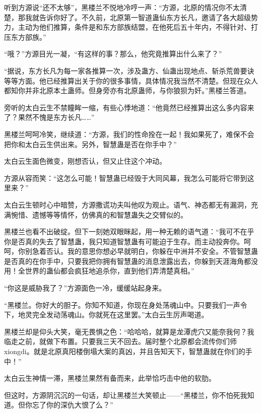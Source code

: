 
\begin{this_body}

听到方源说“还不太够”，黑楼兰不悦地冷哼一声：“方源，北原的情况你不太清楚，那我就告诉你好了。不久前，北原第一智道蛊仙东方长凡，邀请了各大超级势力，主动为他们推算，条件是和东方部族结盟，在他死后五十年内，不得针对、打压东方部族。”

“哦？”方源目光一凝，“有这样的事？那么，他究竟推算出什么来了？”

“据说，东方长凡为每一家各推算一次，涉及蛊方、仙蛊出现地点、斩杀荒兽要诀等等方面。他已经推算出关于你的很多事情，具体情况我当然不清楚。但现在众人都知你并非北原本土蛊师。但身旁亦有北原蛊师，与你狼狈为奸。”黑楼兰答道。

旁听的太白云生不禁瞳眸一缩，有些心悸地道：“他竟然已经推算出这么多内容来了？果然不愧是东方长凡……”

黑楼兰呵呵冷笑，继续道：“方源，我们的性命拴在一起！我如果死了，难保不会把你和太白云生供出来。另外，智慧蛊是否在你手中？”

太白云生面色微变，刚想否认，但又止住这个冲动。

方源从容而笑：“这怎么可能！智慧蛊已经毁于大同风幕，我怎么可能将它带到这里来？”

太白云生顿时心中暗赞，方源撒谎功夫叫他叹为观止。语气、神态都无有漏洞，充满惋惜、遗憾等等情怀，仿佛真的和智慧蛊失之交臂似的。

黑楼兰也看不出破绽。但下一刻她双眼眯起，用一种无赖的语气道：“我可不在乎你是否真的失去了智慧蛊，我只知道智慧蛊有可能迫于生存。而主动投奔你。呵呵，你别急着否认。我的意思你想必早就明白，你躲在中洲并不安全。不管智慧蛊是否真的在你手中，只要我把你拥有智慧蛊的消息泄露出去，你躲到天涯海角都没用！全世界的蛊仙都会疯狂地追杀你，直到他们弄清楚真相。”

“你这是威胁我了？”方源面色一冷，缓缓站起身来。

“黑楼兰。你好大的胆子。你知不知道，你现在身处荡魂山中。只要我们一声令下，地灵完全发动荡魂山。你就死在这里罢。”太白云生厉声喝道。

黑楼兰却是仰头大笑，毫无畏惧之色：“哈哈哈，就算是龙潭虎穴又能奈我何？我临走之前，就做下布置。只要我三天不回去。届时整个北原都会流传你们师xiongdi。就是北原真阳楼倒塌大案的真凶，并且告知天下，智慧蛊就在你们的手中！”

太白云生神情一滞，黑楼兰果然有备而来，此举恰巧击中他的软肋。

但这时，方源阴沉沉的一句话，却让黑楼兰大笑顿止——“黑楼兰，你不怕死我知道。但你忘了你的深仇大恨了么？”


\end{this_body}
